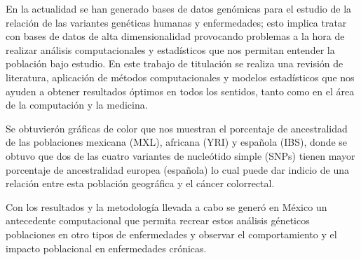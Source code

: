 


\begin{abstracts}        %

En la actualidad se han generado bases de datos gen\'omicas para el estudio de la relaci\'on de las variantes gen\'eticas humanas y enfermedades; esto implica tratar con bases de datos de alta dimensionalidad provocando problemas a la hora de realizar an\'alisis computacionales y estad\'isticos que nos permitan entender la poblaci\'on bajo estudio. En este trabajo de titulación se realiza una revisi\'on de literatura, aplicaci\'on de m\'etodos computacionales y modelos estad\'isticos que nos ayuden a obtener resultados \'optimos en todos los sentidos, tanto como en el \'area de la computación y la medicina.

Se obtuvier\'on gr\'aficas de color que nos muestran el porcentaje de ancestralidad de las poblaciones mexicana (MXL), africana (YRI) y española (IBS), donde se obtuvo que dos de las cuatro variantes de nucle\'otido simple (SNPs) tienen mayor porcentaje de ancestralidad europea (española) lo cual puede dar indicio de una relaci\'on entre esta poblaci\'on geogr\'afica y el c\'ancer colorrectal.

Con los resultados y la metodolog\'ia llevada a cabo se gener\'o en M\'exico un antecedente computacional que permita recrear estos an\'alisis g\'eneticos poblaciones en otro tipos de enfermedades y observar el comportamiento y el impacto poblacional en enfermedades cr\'onicas.  

\end{abstracts}


